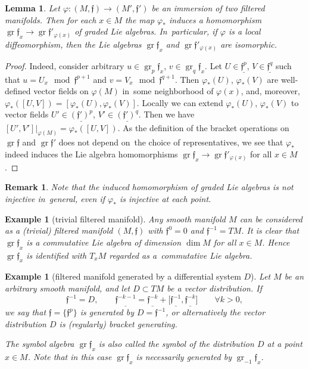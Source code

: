 \documentclass[10pt,a4paper]{amsart}
\newcommand{\f}{\mathfrak f}
\newcommand{\gr}{\operatorname{gr}}
\newtheorem{lem}[thm]{Lemma}
\newtheorem{ex}[thm]{Example}
\newtheorem{rem}[thm]{Remark}}
\numberwithin{equation}{section}
\begin{document}
\begin{lem}
	Let $\varphi\colon (M,\f)\to (M',\f')$ be an immersion of two filtered manifolds. Then for each $x\in M$ the map $\varphi_*$ induces a homomorphism $\gr\f_x \to \gr\f'_{\varphi(x)}$ of graded Lie algebras. In~par\-ti\-cu\-lar, if $\varphi$ is a local diffeomorphism, then the Lie algebras $\gr\f_x$ and $\gr\f'_{\varphi(x)}$ are isomorphic.
\end{lem}
\begin{proof}
	Indeed, consider arbitrary $u\in \gr_p\f_x$, $v\in \gr_q\f_x$. Let $U\in \underline{\f^p}$, $V\in\underline {\f^q}$ such that $u=U_x\mod\f^{p+1}$ and $v=V_x\mod\f^{q+1}$.
Then $\varphi_*(U)$, $\varphi_*(V)$ are well-defined vector fields on $\varphi(M)$ in~some neighborhood of $\varphi(x)$, and, moreover, $\varphi_*([U,V])=[\varphi_*(U),\varphi_*(V)]$. Locally we can extend $\varphi_*(U)$, $\varphi_*(V)$ to vector fields $U'\in\underline{(\f')^p}$, $V'\in\underline{(\f')^q}$. Then we have $[U',V']|_{\varphi(M)} = \varphi_*([U,V])$. As the definition of the bracket operations on $\gr\f$ and $\gr\f'$ does not depend on~the choice of representatives,
we see that $\varphi_*$ indeed induces the Lie algebra homomorphisms
$\gr\f_x\to \gr\f'_{\varphi(x)}$ for all $x\in M$.
\end{proof}
\begin{rem}
	Note that the induced homomorphism of graded Lie algebras is not injective in~general, even if $\varphi_*$ is injective at each point.
\end{rem}

\begin{ex} [trivial filtered manifold] Any smooth manifold $M$ can be considered as a (trivial) filtered manifold $(M,\f)$ with $\f^0=0$ and $\f^{-1} = TM$. It is clear that
	$\gr\f_x$ is a commutative Lie algebra of dimension $\dim M$ for all $x\in M$. Hence $\gr\f_x$ is identified with $T_x M$ regarded as a~commutative Lie algebra.
\end{ex}

\begin{ex} [filtered manifold generated by a differential system $D$]
Let $M$ be an arbitrary smooth manifold, and let $D\subset TM$ be a vector distribution.
If
\[
\f^{-1}=D,\qquad
\underline{\f^{-k-1}}=\underline{\f^{-k}}+\big[\underline{\f^{-1}},\underline{\f^{-k}}\big]\qquad
\forall k>0,
\]
we say that $\f=\{ \f^p\}$ is generated by $D=\f^{-1}$,
or alternatively the vector distribution $D$ is (regularly) bracket generating.

The symbol algebra $\gr \f_x$ is also called the symbol of the distribution $D$ at a point $x\in M$. Note that in this case $\gr \f_x$ is necessarily generated by $\gr_{-1}\f_x$.
\end{ex}
\end{document}
